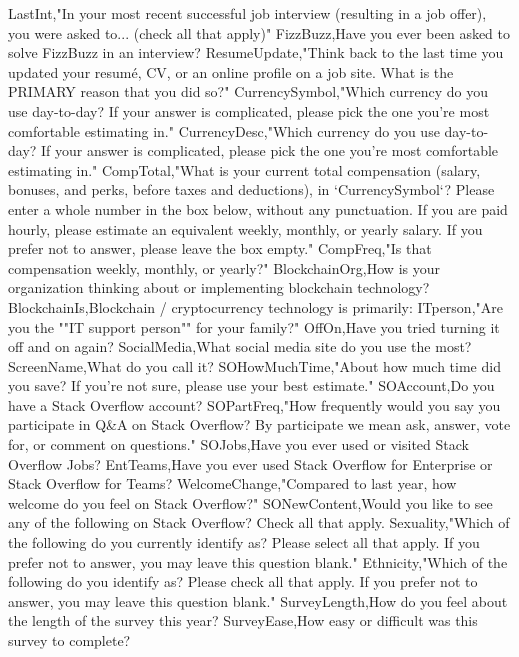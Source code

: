 \begin{appendices}
    LastInt,"In your most recent successful job interview (resulting in a job offer), you were asked to... (check all that apply)"
    FizzBuzz,Have you ever been asked to solve FizzBuzz in an interview?
    ResumeUpdate,"Think back to the last time you updated your resumé, CV, or an online profile on a job site. What is the PRIMARY reason that you did so?"
    CurrencySymbol,"Which currency do you use day-to-day? If your answer is complicated, please pick the one you're most comfortable estimating in."
    CurrencyDesc,"Which currency do you use day-to-day? If your answer is complicated, please pick the one you're most comfortable estimating in."
    CompTotal,"What is your current total compensation (salary, bonuses, and perks, before taxes and deductions), in `CurrencySymbol`? Please enter a whole number in the box below, without any punctuation. If you are paid hourly, please estimate an equivalent weekly, monthly, or yearly salary. If you prefer not to answer, please leave the box empty."
    CompFreq,"Is that compensation weekly, monthly, or yearly?"
    BlockchainOrg,How is your organization thinking about or implementing blockchain technology?
    BlockchainIs,Blockchain / cryptocurrency technology is primarily:
    ITperson,"Are you the ""IT support person"" for your family?"
    OffOn,Have you tried turning it off and on again?
    SocialMedia,What social media site do you use the most?
    ScreenName,What do you call it?
    SOHowMuchTime,"About how much time did you save? If you're not sure, please use your best estimate."
    SOAccount,Do you have a Stack Overflow account?
    SOPartFreq,"How frequently would you say you participate in Q&A on Stack Overflow? By participate we mean ask, answer, vote for, or comment on questions."
    SOJobs,Have you ever used or visited Stack Overflow Jobs?
    EntTeams,Have you ever used Stack Overflow for Enterprise or Stack Overflow for Teams?
    WelcomeChange,"Compared to last year, how welcome do you feel on Stack Overflow?"
    SONewContent,Would you like to see any of the following on Stack Overflow? Check all that apply.
    Sexuality,"Which of the following do you currently identify as? Please select all that apply. If you prefer not to answer, you may leave this question blank."
    Ethnicity,"Which of the following do you identify as? Please check all that apply. If you prefer not to answer, you may leave this question blank."
    SurveyLength,How do you feel about the length of the survey this year?
    SurveyEase,How easy or difficult was this survey to complete?
\end{appendices}
\thispagestyle{normal}
